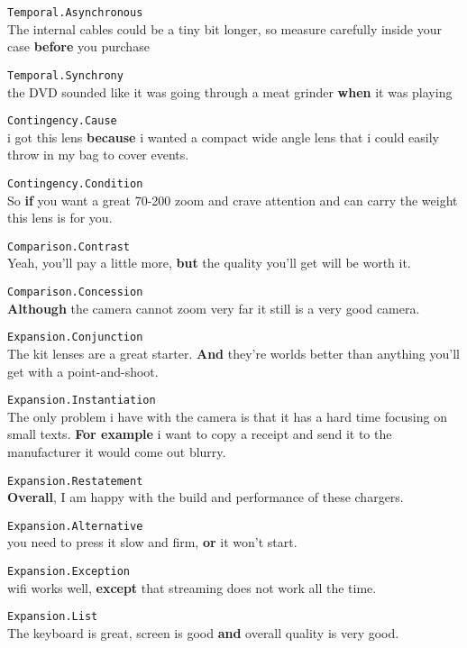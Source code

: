 \documentclass[
    a4paper,%
    12pt,%
    oneside,%
    toc=bibliography,
    final,
]{scrartcl}
\begin{document}
\begin{exe}
\ex\label{ex:pdtb-types-first} \lstinline|Temporal.Asynchronous|\\
The internal cables could be a tiny bit longer, so measure carefully inside your case \textbf{before} you purchase

\ex \lstinline|Temporal.Synchrony|\\
the DVD sounded like it was going through a meat grinder \textbf{when} it was playing

\ex \lstinline|Contingency.Cause|\\
i got this lens \textbf{because} i wanted a compact wide angle lens that i could easily throw in my bag to cover events.

\ex \lstinline|Contingency.Condition|\\
So \textbf{if} you want a great 70-200 zoom and crave attention and can carry the weight this lens is for you.

\ex \lstinline|Comparison.Contrast|\\
Yeah, you'll pay a little more, \textbf{but} the quality you'll get will be worth it.

\ex \lstinline|Comparison.Concession|\\
\textbf{Although} the camera cannot zoom very far it still is a very good camera.

\ex \lstinline|Expansion.Conjunction|\\
The kit lenses are a great starter. \textbf{And} they're worlds better than anything you'll get with a point-and-shoot.

\ex \lstinline|Expansion.Instantiation|\\
The only problem i have with the camera is that it has a hard time focusing on small texts. \textbf{For example} i want to copy a receipt and send it to the manufacturer it would come out blurry.

\ex \lstinline|Expansion.Restatement|\\
\textbf{Overall}, I am happy with the build and performance of these chargers.

\ex \lstinline|Expansion.Alternative|\\
you need to press it slow and firm, \textbf{or} it won't start.

\ex \lstinline|Expansion.Exception|\\
wifi works well, \textbf{except} that streaming does not work all the time.

\ex\label{ex:pdtb-types-last} \lstinline|Expansion.List|\\
The keyboard is great, screen is good \textbf{and} overall quality is very good.
\end{exe}
\end{document}
